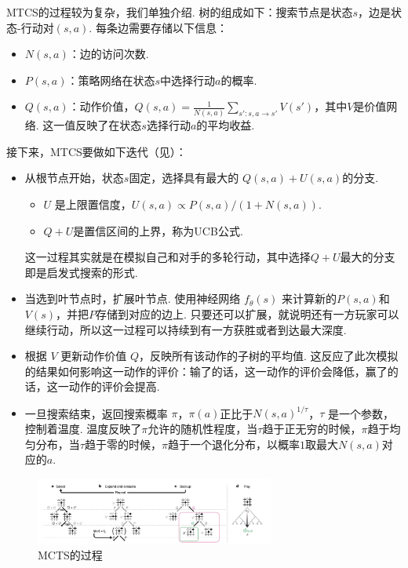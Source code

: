 MTCS的过程较为复杂，我们单独介绍. 树的组成如下：搜索节点是状态$s$，边是状态-行动对$(s,a)$. 每条边需要存储以下信息：
\begin{itemize}
    \item $N(s,a)$：边的访问次数.
    \item $P(s,a)$：策略网络在状态$s$中选择行动$a$的概率.
    \item $Q(s,a)$：动作价值，$Q(s,a)=\frac{1}{N(s,a)}\sum_{s':s,a\to s'} V(s')$，其中$V$是价值网络. 这一值反映了在状态$s$选择行动$a$的平均收益.
\end{itemize}

接下来，MTCS要做如下迭代（见）：
\begin{itemize}
  \item 从根节点开始，状态$s$固定，选择具有最大的 $Q(s,a) + U(s,a)$的分支. 
  \begin{itemize}
    \item $U$ 是上限置信度，$U(s,a)\propto{P(s,a)}/(1+N(s,a))$.
    \item $Q+U$是置信区间的上界，称为UCB公式. 
  \end{itemize}
  这一过程其实就是在模拟自己和对手的多轮行动，其中选择$Q+U$最大的分支即是启发式搜索的形式. 

  \item 当选到叶节点时，扩展叶节点. 使用神经网络 $f_\theta(s)$ 来计算新的$P(s,a)$和$V(s)$，并把$P$存储到对应的边上. 只要还可以扩展，就说明还有一方玩家可以继续行动，所以这一过程可以持续到有一方获胜或者到达最大深度.

  \item 根据 $V$ 更新动作价值 $Q$，反映所有该动作的子树的平均值. 这反应了此次模拟的结果如何影响这一动作的评价：输了的话，这一动作的评价会降低，赢了的话，这一动作的评价会提高.

  \item 一旦搜索结束，返回搜索概率 $\pi$，$\pi(a)$正比于$N(s,a)^{1/\tau}$，$\tau$ 是一个参数，控制着温度. 温度反映了$\pi$允许的随机性程度，当$\tau$趋于正无穷的时候，$\pi$趋于均匀分布，当$\tau$趋于零的时候，$\pi$趋于一个退化分布，以概率$1$取最大$N(s,a)$对应的$a$.
\end{itemize}

\begin{figure}[ht]
\centering
\includegraphics[width=0.7\textwidth]{Figures/game/mcts.png}
    \caption{MCTS的过程}
    \label{fig:mcts}
\end{figure}

